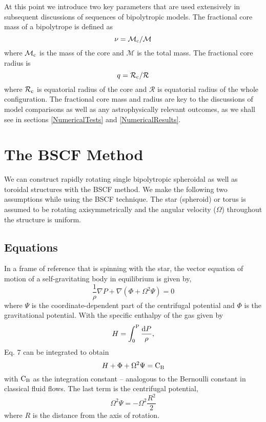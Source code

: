 \documentclass[a4paper,fleqn,usenatbib]{mnras}
\newcommand*\diff{\mathop{}\!\mathrm{d}}
\begin{document}
At this point we introduce two key parameters that are used extensively in subsequent discussions of sequences of bipolytropic models.
The fractional core mass of a bipolytrope is defined as
\begin{equation}
\nu= \mathcal{M}_{\rm c}/ \mathcal{M}
\end{equation}
where $\mathcal{M}_{\rm c}$ is the mass of the core and $\mathcal{M}$ is the total mass. The fractional core radius is 
\begin{equation}
q= \mathcal{R}_{\rm c}/ \mathcal{R}
\end{equation}
where $\mathcal{R}_{\rm c}$ is equatorial radius of the core and $\mathcal R$ is equatorial radius of the whole configuration. The fractional core mass and radius are key to the discussions of model comparisons as well as any astrophysically relevant outcomes, as we shall see in sections \ref{NumericalTests} and \ref{NumericalResults}.

\section{The BSCF Method}
We can construct rapidly rotating single bipolytropic spheroidal as well as toroidal structures with the BSCF method.  
We make the following two assumptions while using the BSCF technique. 
The star (spheroid) or torus is assumed to be rotating axisymmetrically and the angular velocity ($\Omega$) throughout the structure is uniform.

\subsection{Equations}

In a frame of reference that is spinning with the star, the vector equation of motion of a self-gravitating body in equilibrium is given by, 
\begin{equation}
\frac{1}{\rho} \nabla P + \nabla (\Phi + \Omega^2 \Psi) =0
\end{equation}
where $\Psi$ is the coordinate-dependent part of the centrifugal potential and $\Phi$ is the gravitational potential.
With the specific enthalpy of the gas given by 
\begin{equation}
H= \int_0^{\rm P} {\frac{\diff{P}}{\rho}} ,
\end{equation}
Eq. 7 can be integrated to obtain
\begin{equation}
H+\Phi+\Omega^2 \Psi = {\rm C_B}
\end{equation}
with ${\rm C_B}$ as the integration constant -- analogous to the Bernoulli constant in classical fluid flows.
The last term is the centrifugal potential,
\begin{equation}
\Omega^2\Psi = -\Omega^2\frac{R^2}{2}
\end{equation}
where $R$ is the distance from the axis of rotation.
\end{document}
